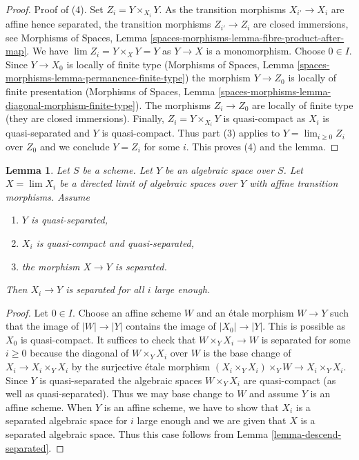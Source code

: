\documentclass{stacks-project}
\theoremstyle{plain}
\newtheorem{lemma}[subsection]{Lemma}
\theoremstyle{definition}
\theoremstyle{remark}
\numberwithin{equation}{subsection}
\def\lim{\mathop{\mathrm{lim}}\nolimits}
\begin{document}
\begin{proof}
\medskip\noindent
Proof of (4). Set $Z_i = Y \times_{X_i} Y$.
As the transition morphisms $X_{i'} \to X_i$ are affine hence separated,
the transition morphisms $Z_{i'} \to Z_i$ are closed immersions, see
Morphisms of Spaces, Lemma
\ref{spaces-morphisms-lemma-fibre-product-after-map}.
We have $\lim Z_i = Y \times_X Y = Y$ as $Y \to X$ is a monomorphism.
Choose $0 \in I$. Since $Y \to X_0$ is locally of finite type
(Morphisms of Spaces, Lemma
\ref{spaces-morphisms-lemma-permanence-finite-type})
the morphism $Y \to Z_0$ is locally of finite presentation
(Morphisms of Spaces, Lemma
\ref{spaces-morphisms-lemma-diagonal-morphism-finite-type}).
The morphisms $Z_i \to Z_0$ are locally of finite type
(they are closed immersions).
Finally, $Z_i = Y \times_{X_i} Y$ is quasi-compact as
$X_i$ is quasi-separated and $Y$ is quasi-compact.
Thus part (3) applies to $Y = \lim_{i \geq 0} Z_i$ over $Z_0$
and we conclude $Y = Z_i$ for some $i$. This proves (4) and the lemma.
\end{proof}

\begin{lemma}
\label{lemma-eventually-separated}
Let $S$ be a scheme. Let $Y$ be an algebraic space over $S$.
Let $X = \lim X_i$ be a directed limit of algebraic spaces over $Y$
with affine transition morphisms. Assume
\begin{enumerate}
\item $Y$ is quasi-separated,
\item $X_i$ is quasi-compact and quasi-separated,
\item the morphism $X \to Y$ is separated.
\end{enumerate}
Then $X_i \to Y$ is separated for all $i$ large enough.
\end{lemma}

\begin{proof}
Let $0 \in I$. Choose an affine scheme $W$ and an \'etale morphism
$W \to Y$ such that the image of $|W| \to |Y|$ contains the image of
$|X_0| \to |Y|$. This is possible as $X_0$ is quasi-compact.
It suffices to check that $W \times_Y X_i \to W$ is separated
for some $i \geq 0$ because the diagonal of $W \times_Y X_i$
over $W$ is the base change of $X_i \to X_i \times_Y X_i$ by
the surjective \'etale morphism $(X_i \times_Y X_i) \times_Y W \to
X_i \times_Y X_i$. Since $Y$ is quasi-separated the algebraic spaces
$W \times_Y X_i$ are quasi-compact (as well as quasi-separated).
Thus we may base change to $W$ and assume $Y$ is an affine scheme.
When $Y$ is an affine scheme, we have to show that $X_i$ is a
separated algebraic space for $i$ large enough and we are given that
$X$ is a separated algebraic space. Thus this case follows from
Lemma \ref{lemma-descend-separated}.
\end{proof}
\end{document}
